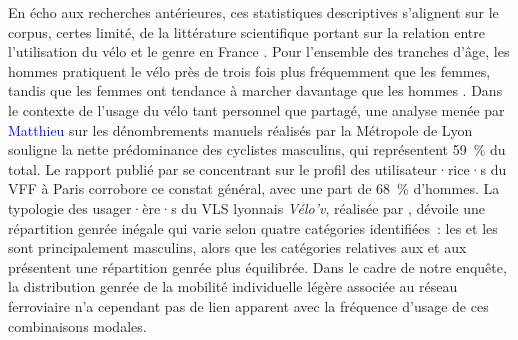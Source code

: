 \begin{refsegment}
En écho aux recherches antérieures, ces statistiques descriptives s'alignent sur le corpus, certes limité, de la littérature scientifique portant sur la relation entre l'utilisation du vélo et le genre en France \textcolor{blue}{\autocite[1]{gaudron-arlon_gender_2022}}. Pour l'ensemble des tranches d'âge, les hommes pratiquent le vélo près de trois fois plus fréquemment que les femmes, tandis que les femmes ont tendance à marcher davantage que les hommes \textcolor{blue}{\autocite[2]{rossignol_femmes_2023}}. Dans le contexte de l'usage du vélo tant personnel que partagé, une analyse menée par \textcolor{blue}{Matthieu} \textcolor{blue}{\textcite{adam_quart_2018}} sur les dénombrements manuels réalisés par la Métropole de Lyon souligne la nette prédominance des cyclistes masculins, qui représentent 59~\% du total. Le rapport publié par \textcolor{blue}{\textcite[27]{6t-bureau_de_recherche_etude_2018}} se concentrant sur le profil des utilisateur·rice·s du \acrshort{VFF} à Paris corrobore ce constat général, avec une part de 68~\% d'hommes. La typologie des usager·ère·s du \acrshort{VLS} lyonnais \textsl{Vélo'v}, réalisée par \textcolor{blue}{\textcite[289]{vogel_bicycle_2014}}, dévoile une répartition genrée inégale qui varie selon quatre catégories identifiées~: les  et les  sont principalement masculins, alors que les catégories relatives aux  et aux  présentent une répartition genrée plus équilibrée. Dans le cadre de notre enquête, la distribution genrée de la mobilité individuelle légère associée au réseau ferroviaire n'a cependant pas de lien apparent avec la fréquence d'usage de ces combinaisons modales.%


\end{refsegment}
